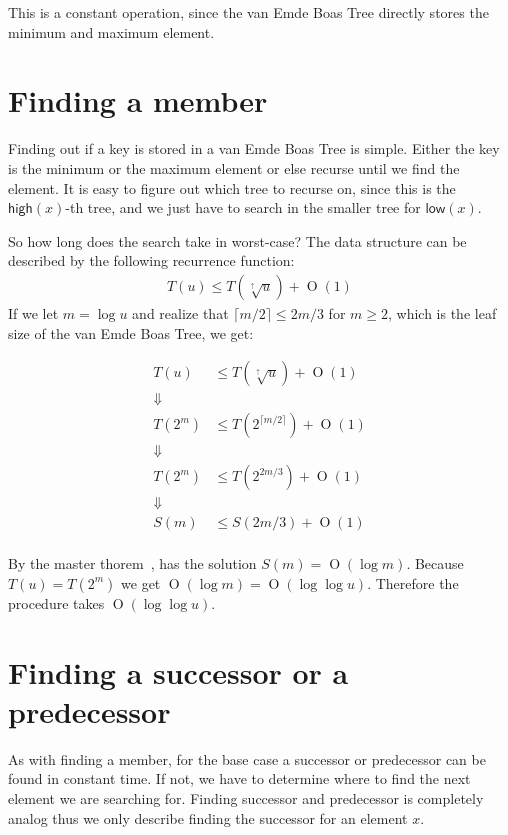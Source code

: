 \documentclass[oneside,11pt,openright]{report}
\newcommand{\BigO}[1]{\ensuremath{\operatorname{O}\left(#1\right)}}
\newcommand{\HIGH}{\textsf{high}}
\newcommand{\LOW}{\textsf{low}}
\newcommand{\HIGHER}{\sqrt[\uparrow]{u}}
\begin{document}
This is a constant operation, since the van Emde Boas Tree directly stores the minimum and maximum element.

\section{Finding a member}

Finding out if a key is stored in a van Emde Boas Tree is simple. Either the key is the minimum or the maximum element or else recurse until we find the element. It is easy to figure out which tree to recurse on, since this is the $\HIGH(x)$-th tree, and we just have to search in the smaller tree for $\LOW(x)$.

So how long does the search take in worst-case? The data structure can be described by the following recurrence function: 
\begin{align*}
    T(u) \leq T(\HIGHER) + \BigO{1}
\end{align*}
If we let $m = \log u$ and realize that $\lceil{m/2}\rceil \leq 2m/3$ for $m \geq 2$, which is the leaf size of the van Emde Boas Tree, we get:

\begin{align*}
    T(u)  & \leq T(\HIGHER) + \BigO{1} \\
    \Downarrow \\
    T(2^m) & \leq T(2^{\lceil{m/2}\rceil}) + \BigO{1} \\
    \Downarrow \\
    T(2^m) & \leq T(2^{2m/3}) + \BigO{1} \\
    \Downarrow \\
    S(m) & \leq S(2m/3) + \BigO{1} \\
\end{align*}

By the master thorem~\cite[p. 93]{ITA09}, has the solution $S(m) = \BigO{\log m}$. Because $T(u) = T(2^m)$ we get $\BigO{\log m} = \BigO{\log \log u}$. Therefore the procedure takes $\BigO{\log \log u}$.

\section{Finding a successor or a predecessor}

As with finding a member, for the base case a successor or predecessor can be found in constant time. If not, we have to determine where to find the next element we are searching for. Finding successor and predecessor is completely analog thus we only describe finding the successor for an element $x$.
\end{document}
